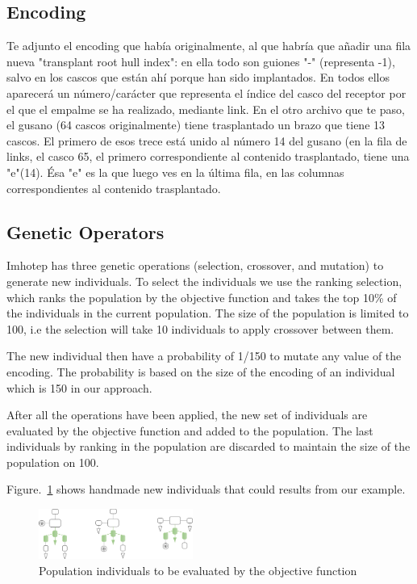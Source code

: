 \subsection{Encoding}

Te adjunto el encoding que había originalmente, al que habría que añadir una fila nueva "transplant root hull index": en ella todo son guiones "-" (representa -1), salvo en los cascos que están ahí porque han sido implantados. En todos ellos aparecerá un número/carácter que representa el índice del casco del receptor por el que el empalme se ha realizado, mediante link. En el otro archivo que te paso, el gusano (64 cascos originalmente) tiene trasplantado un brazo que tiene 13 cascos. El primero de esos trece está unido al número 14 del gusano (en la fila de links, el casco 65, el primero correspondiente al contenido trasplantado, tiene una "e"(14). Ésa "e" es la que luego ves en la última fila, en las columnas correspondientes al contenido trasplantado.

\subsection{Genetic Operators}

Imhotep has three genetic operations (selection, crossover, and mutation) to generate new individuals. To select the individuals we use the ranking selection, which ranks the population by the objective function and takes the top 10\% of the individuals in the current population. The size of the population is limited to 100, i.e the selection will take 10 individuals to apply crossover between them.


The new individual then have a probability of 1/150 to mutate any value of the encoding. The probability is based on the size of the encoding of an individual which is 150 in our approach.

After all the operations have been applied, the new set of individuals are evaluated by the objective function and added to the population. The last individuals by ranking in the population are discarded to maintain the size of the population on 100. 

Figure.~\ref{fig:candidates} shows handmade new individuals that could results from our example.

\begin{figure}[h]
    \centering
    \includegraphics[width=0.45\textwidth]{Figures/candidates.png}
    \caption{Population individuals to be evaluated by the objective function}
    \label{fig:candidates}
\end{figure}


